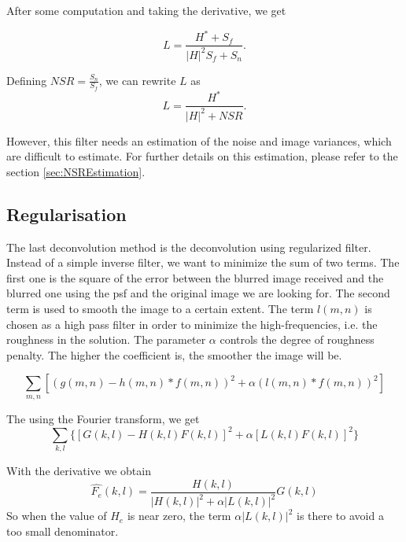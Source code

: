 After some computation and taking the derivative, we get

\begin{equation}
L = \frac{H^*+S_f}{|H|^2 S_f + S_n}.
\label{eq:LsemiFinal}
\end{equation}

Defining $NSR = \frac{S_n}{S_f}$, we can rewrite $L$ as 
\begin{equation}
L = \frac{H^*}{|H|^2 + NSR}.
\end{equation}

However, this filter needs an estimation of the noise and image variances, which are difficult to estimate. For further details on this estimation, please refer to the section \ref{sec:NSREstimation}.

\subsection{Regularisation}
The last deconvolution method is the deconvolution using regularized filter. 
Instead of a simple inverse filter, we want to minimize the sum of two terms. The first one is the square of the error between the blurred image received and the blurred one using the psf and the original image we are looking for. The second term is used to smooth the image to a certain extent. The term $l(m,n)$ is chosen as a high pass filter in order to minimize the high-frequencies, i.e. the roughness in the solution. The parameter $\alpha$ controls the degree of roughness penalty. The higher the coefficient is, the smoother the image will be. %

\begin{equation}
\sum_{m,n} \left[ (g(m,n) - h(m,n)*f(m,n))^2 + \alpha (l(m,n)*f(m,n))^2 \right]
\end{equation}

The using the Fourier transform, we get
\begin{equation}
\sum_{k,l} \{ [G(k,l) - H(k,l)F(k,l)]^2 + \alpha [L(k,l)F(k,l)]^2\}
\end{equation}

With the derivative we obtain
\begin{equation}
\hat{F_e}(k,l) = \frac{H(k,l)}{|H(k,l)|^2 + \alpha |L(k,l)|^2} G(k,l)
\end{equation}
So when the value of $H_e$ is near zero, the term $\alpha |L(k,l)|^2$ is there to avoid a too small denominator. 

